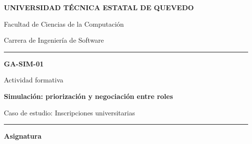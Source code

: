 \documentclass[12pt,a4paper]{article}
\begin{document}

\begin{titlepage}

    \centering
    \singlespacing
    \setlength{\parskip}{0pt}
    \thispagestyle{empty}

    \vspace*{0.3cm}

    {\Large\bfseries\color{azul}
    UNIVERSIDAD TÉCNICA ESTATAL DE QUEVEDO\par}

    \vspace{0.25cm}

    {\large
    Facultad de Ciencias de la Computación\par}

    {\large
    Carrera de Ingeniería de Software\par}

    \vspace{0.5cm}

    {\color{acento}\rule{\textwidth}{1.5pt}\par}

    \vspace{0.5cm}

    {\Huge\bfseries\color{azul}
    GA-SIM-01\par}

    \vspace{0.2cm}

    {\large Actividad formativa\par}

    \vspace{0.35cm}

    {\LARGE\bfseries
    Simulación: priorización y negociación entre roles\par}

    \vspace{0.35cm}

    {\large
    Caso de estudio: Inscripciones universitarias\par}

    \vspace{0.5cm}

    {\color{acento}\rule{\textwidth}{1.5pt}\par}

    \vspace{0.5cm}

    {\bfseries\color{azul}Asignatura\par}


\end{titlepage}
\end{document}
